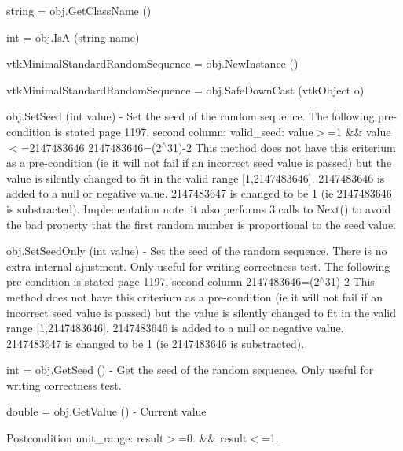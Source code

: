 \begin{DoxyItemize}
\item {\ttfamily string = obj.\-Get\-Class\-Name ()}  
\item {\ttfamily int = obj.\-Is\-A (string name)}  
\item {\ttfamily vtk\-Minimal\-Standard\-Random\-Sequence = obj.\-New\-Instance ()}  
\item {\ttfamily vtk\-Minimal\-Standard\-Random\-Sequence = obj.\-Safe\-Down\-Cast (vtk\-Object o)}  
\item {\ttfamily obj.\-Set\-Seed (int value)} -\/ Set the seed of the random sequence. The following pre-\/condition is stated page 1197, second column\-: valid\-\_\-seed\-: value$>$=1 \&\& value$<$=2147483646 2147483646=(2$^\wedge$31)-\/2 This method does not have this criterium as a pre-\/condition (ie it will not fail if an incorrect seed value is passed) but the value is silently changed to fit in the valid range \mbox{[}1,2147483646\mbox{]}. 2147483646 is added to a null or negative value. 2147483647 is changed to be 1 (ie 2147483646 is substracted). Implementation note\-: it also performs 3 calls to Next() to avoid the bad property that the first random number is proportional to the seed value.  
\item {\ttfamily obj.\-Set\-Seed\-Only (int value)} -\/ Set the seed of the random sequence. There is no extra internal ajustment. Only useful for writing correctness test. The following pre-\/condition is stated page 1197, second column 2147483646=(2$^\wedge$31)-\/2 This method does not have this criterium as a pre-\/condition (ie it will not fail if an incorrect seed value is passed) but the value is silently changed to fit in the valid range \mbox{[}1,2147483646\mbox{]}. 2147483646 is added to a null or negative value. 2147483647 is changed to be 1 (ie 2147483646 is substracted).  
\item {\ttfamily int = obj.\-Get\-Seed ()} -\/ Get the seed of the random sequence. Only useful for writing correctness test.  
\item {\ttfamily double = obj.\-Get\-Value ()} -\/ Current value \begin{DoxyPostcond}{Postcondition}
unit\-\_\-range\-: result$>$=0. \&\& result$<$=1.  
\end{DoxyPostcond}


\end{DoxyItemize}
